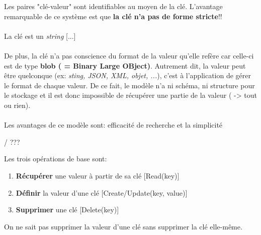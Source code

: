 \item{}
{\vrai}
{Les paires "clé-valeur" sont identifiables au moyen de la clé. L'avantage remarquable de ce système est que \textbf{la clé n'a pas de forme stricte}!!
\paragraph{}
La clé est un \textit{string} [...]
\paragraph{}
De plus, la clé n'a pas conscience du format de la valeur qu'elle refère car celle-ci est de type \textbf{blob ( = Binary Large OBject)}. Autrement dit, la valeur peut être quelconque (ex: \textit{sting, JSON, XML, objet, ...}), c'est à l'application de gérer le format de chaque valeur. De ce fait, le modèle n'a ni schéma, ni structure pour le stockage et il est donc impossible de récupérer une partie de la valeur ( -> tout ou rien).
\paragraph{}
Les avantages de ce modèle sont: efficacité de recherche et la simplicité 
}


\item{}
{\vrai / \faux???}
{Les trois opérations de base sont:
\begin{enumerate}
\item \textbf{Récupérer} une valeur à partir de sa clé [Read(key)]
\item \textbf{Définir} la valeur d'une clé [Create/Update(key, value)]
\item \textbf{Supprimer} une clé [Delete(key)]
\end{enumerate}
On ne sait pas supprimer la valeur d'une clé sans supprimer la clé elle-même.
}

